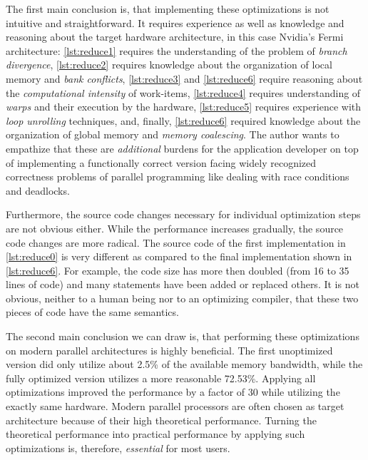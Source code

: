The first main conclusion is, that implementing these optimizations is not intuitive and straightforward.
It requires experience as well as knowledge and reasoning about the target hardware architecture, in this case Nvidia's Fermi \GPU architecture:
\autoref{lst:reduce1} requires the understanding of the problem of \emph{branch divergence}, \autoref{lst:reduce2} requires knowledge about the organization of local memory and \emph{bank conflicts}, \autoref{lst:reduce3} and \autoref{lst:reduce6} require reasoning about the \emph{computational intensity} of work-items, \autoref{lst:reduce4} requires understanding of \emph{warps} and their execution by the hardware, \autoref{lst:reduce5} requires experience with \emph{loop unrolling} techniques, and, finally, \autoref{lst:reduce6} required knowledge about the organization of global memory and \emph{memory coalescing}.
The author wants to empathize that these are \emph{additional} burdens for the application developer on top of implementing a functionally correct version facing widely recognized correctness problems of parallel programming like dealing with race conditions and deadlocks.

Furthermore, the source code changes necessary for individual optimization steps are not obvious either.
While the performance increases gradually, the source code changes are more radical.
The source code of the first implementation in \autoref{lst:reduce0} is very different as compared to the final implementation shown in \autoref{lst:reduce6}.
For example, the code size has more then doubled (from 16 to 35 lines of code) and many statements have been added or replaced others.
It is not obvious, neither to a human being nor to an optimizing compiler, that these two pieces of code have the same semantics.

The second main conclusion we can draw is, that performing these optimizations on modern parallel architectures is highly beneficial.
The first unoptimized version did only utilize about 2.5\% of the available memory bandwidth, while the fully optimized version utilizes a more reasonable 72.53\%.
Applying all optimizations improved the performance by a factor of $30$ while utilizing the exactly same hardware.
Modern parallel processors are often chosen as target architecture because of their high theoretical performance.
Turning the theoretical performance into practical performance by applying such optimizations is, therefore, \emph{essential} for most users.





